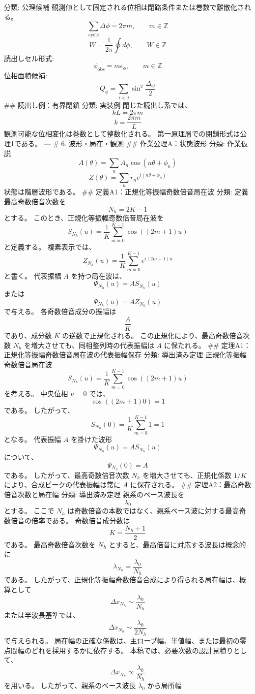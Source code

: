 \documentclass[
  a4paper,
]{ltjsarticle}
\begin{document}
分類: 公理候補
観測値として固定される位相は閉路条件または巻数で離散化される。 \[
\sum_{\mathrm{cycle}}\Delta\phi=2\pi m,\qquad m\in\mathbb{Z}
\] \[
W=\frac{1}{2\pi}\oint d\phi,\qquad W\in\mathbb{Z}
\] 読出しセル形式: \[
\phi_{\mathrm{obs}}=m\epsilon_\phi,\qquad m\in\mathbb{Z}
\] 位相面積候補: \[
Q_\phi=\sum_{i<j}\sin^2\frac{\Delta_{ij}}{2}
\] \#\# 読出し例：有界閉鎖 分類: 実装例 閉じた読出し系では、 \[
kL=2\pi m
\] \[
k=\frac{2\pi m}{L}
\] 観測可能な位相変化は巻数として整数化される。
第一原理層での閉鎖形式は公理1である。 --- \# 6. 波形・局在・観測 \#\#
作業公理A：状態波形 分類: 作業仮説 \[
A(\theta)=\sum_n A_n\cos(n\theta+\phi_n)
\] \[
Z(\theta)=\sum_n r_n e^{i(n\theta+\phi_n)}
\] 状態は階層波形である。 \#\# 定義A1：正規化等振幅奇数倍音局在波 分類:
定義 最高奇数倍音次数を \[
N_h=2K-1
\] とする。 このとき、正規化等振幅奇数倍音局在波を \[
S_{N_h}(u)=\frac{1}{K}\sum_{m=0}^{K-1}\cos((2m+1)u)
\] と定義する。 複素表示では、 \[
Z_{N_h}(u)=\frac{1}{K}\sum_{m=0}^{K-1}e^{i(2m+1)u}
\] と書く。 代表振幅 \(A\) を持つ局在波は、 \[
\Psi_{N_h}(u)=A S_{N_h}(u)
\] または \[
\Psi_{N_h}(u)=A Z_{N_h}(u)
\] で与える。 各奇数倍音成分の振幅は \[
\frac{A}{K}
\] であり、成分数 \(K\) の逆数で正規化される。
この正規化により、最高奇数倍音次数 \(N_h\)
を増大させても、同相整列時の代表振幅は \(A\) に保たれる。 \#\#
定理A1：正規化等振幅奇数倍音局在波の代表振幅保存 分類: 導出済み定理
正規化等振幅奇数倍音局在波 \[
S_{N_h}(u)=\frac{1}{K}\sum_{m=0}^{K-1}\cos((2m+1)u)
\] を考える。 中央位相 \(u=0\) では、 \[
\cos((2m+1)0)=1
\] である。 したがって、 \[
S_{N_h}(0)=\frac{1}{K}\sum_{m=0}^{K-1}1=1
\] となる。 代表振幅 \(A\) を掛けた波形 \[
\Psi_{N_h}(u)=A S_{N_h}(u)
\] について、 \[
\Psi_{N_h}(0)=A
\] である。 したがって、最高奇数倍音次数 \(N_h\)
を増大させても、正規化係数 \(1/K\) により、合成ピークの代表振幅は常に
\(A\) に保存される。 \#\# 定理A2：最高奇数倍音次数と局在幅 分類:
導出済み定理 親系のベース波長を \[
\lambda_0
\] とする。 ここで \(N_h\)
は奇数倍音の本数ではなく、親系ベース波に対する最高奇数倍音の倍率である。
奇数倍音成分数は \[
K=\frac{N_h+1}{2}
\] である。 最高奇数倍音次数を \(N_h\)
とすると、最高倍音に対応する波長は概念的に \[
\lambda_{N_h}=\frac{\lambda_0}{N_h}
\] である。
したがって、正規化等振幅奇数倍音合成により得られる局在幅は、概算として
\[
\Delta x_{N_h}\sim\frac{\lambda_0}{N_h}
\] または半波長基準では、 \[
\Delta x_{N_h}\sim\frac{\lambda_0}{2N_h}
\] で与えられる。
局在幅の正確な係数は、主ローブ幅、半値幅、または最初の零点間幅のどれを採用するかに依存する。
本稿では、必要次数の設計見積りとして、 \[
\Delta x_{N_h}\propto\frac{\lambda_0}{N_h}
\] を用いる。 したがって、親系のベース波長 \(\lambda_0\) から局所幅
\end{document}
